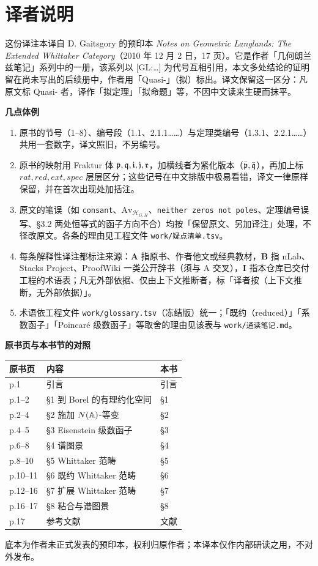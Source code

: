 \chapter*{译者说明}

这份译注本译自 D. Gaitsgory 的预印本 \emph{Notes on Geometric Langlands: The Extended Whittaker Category}（2010 年 12 月 2 日，17 页）。它是作者「几何朗兰兹笔记」系列中的一册，该系列以 [GL:…] 为代号互相引用，本文多处结论的证明留在尚未写出的后续册中，作者用「Quasi-」（拟）标出。译文保留这一区分：凡原文标 Quasi- 者，译作「拟定理」「拟命题」等，不因中文读来生硬而抹平。

\medskip
\noindent\textbf{几点体例}

\begin{enumerate}[leftmargin=2.2em, itemsep=0.35em]
\item 原书的节号（1--8）、编号段（1.1、2.1.1……）与定理类编号（1.3.1、2.2.1……）共用一套数字，译文照旧，不另编号。
\item 原书的映射用 Fraktur 体 $\mathfrak{p},\mathfrak{q},\mathfrak{i},\mathfrak{j},\mathfrak{r}$，加横线者为紧化版本（$\bar{\mathfrak{p}},\bar{\mathfrak{q}}$），再加上标 $rat,red,ext,spec$ 层层区分；这些记号在中文排版中极易看错，译文一律原样保留，并在首次出现处加括注。
\item 原文的笔误（如 \texttt{consant}、$\mathrm{Av}_{\mathcal H_{G,H}}$、\texttt{neither zeros not poles}、定理编号误写、§3.2 两处恒等式的函子方向不合）均按「保留原文、另加译注」处理，不径改原文。各条的理由见工程文件 \texttt{work/疑点清单.tsv}。
\item 每条解释性译注都标注来源：\textbf{A} 指原书、作者他文或经典教材，\textbf{B} 指 nLab、Stacks Project、ProofWiki 一类公开辞书（须与 A 交叉），\textbf{I} 指本仓库已交付工程的术语表；凡无外部依据、仅由上下文推断者，标「译者按（上下文推断，无外部依据）」。
\item 术语依工程文件 \texttt{work/glossary.tsv}（冻结版）统一；「既约（reduced）」「系数函子」「Poincaré 级数函子」等取舍的理由见该表与 \texttt{work/通读笔记.md}。
\end{enumerate}

\medskip
\noindent\textbf{原书页与本书节的对照}

\begin{center}
\begin{tabular}{lll}
\toprule
原书页 & 内容 & 本书 \\
\midrule
p.1 & 引言 & 引言 \\
p.1--2 & §1 到 Borel 的有理约化空间 & §1 \\
p.2--4 & §2 施加 $N(\mathbb{A})$-等变 & §2 \\
p.4--5 & §3 Eisenstein 级数函子 & §3 \\
p.6--8 & §4 谱图景 & §4 \\
p.8--10 & §5 Whittaker 范畴 & §5 \\
p.10--11 & §6 既约 Whittaker 范畴 & §6 \\
p.12--16 & §7 扩展 Whittaker 范畴 & §7 \\
p.16--17 & §8 粘合与谱图景 & §8 \\
p.17 & 参考文献 & 文献 \\
\bottomrule
\end{tabular}
\end{center}

\medskip
\noindent 底本为作者未正式发表的预印本，权利归原作者；本译本仅作内部研读之用，不对外发布。
